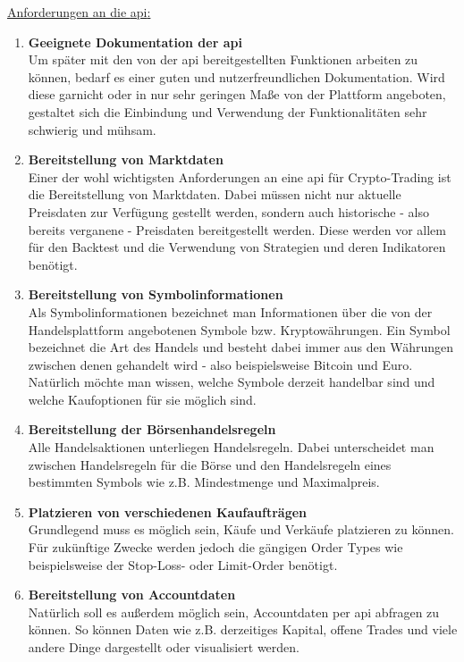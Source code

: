 \documentclass[oneside]{ausarbeitung}
\begin{document}
\underline{Anforderungen an die \ac{api}:}
\begin{enumerate}
	\item \textbf{Geeignete Dokumentation der \ac{api}} \\
		Um später mit den von der \ac{api} bereitgestellten Funktionen arbeiten
		zu können, bedarf es einer guten und nutzerfreundlichen Dokumentation.
		Wird diese garnicht oder in nur sehr geringen Maße von der Plattform
		angeboten, gestaltet sich die Einbindung und Verwendung der 
		Funktionalitäten sehr schwierig und mühsam.
	\item \textbf{Bereitstellung von Marktdaten} \\
		Einer der wohl wichtigsten Anforderungen an eine \ac{api} für
		Crypto-Trading ist die Bereitstellung von Marktdaten. Dabei müssen nicht
		nur aktuelle Preisdaten zur Verfügung gestellt werden, sondern auch
		historische - also bereits verganene - Preisdaten bereitgestellt werden.
		Diese werden vor allem für den Backtest und die Verwendung von
		Strategien und deren Indikatoren benötigt. 
	\item \textbf{Bereitstellung von Symbolinformationen} \\
		Als Symbolinformationen bezeichnet man Informationen über die von der
		Handelsplattform angebotenen Symbole bzw. Kryptowährungen. Ein Symbol
		bezeichnet die Art des Handels und besteht dabei immer aus den Währungen
		zwischen denen gehandelt wird - also beispielsweise Bitcoin und Euro.
		Natürlich möchte man wissen, welche Symbole derzeit handelbar sind und
		welche Kaufoptionen für sie möglich sind.
	\item \textbf{Bereitstellung der Börsenhandelsregeln} \\
		Alle Handelsaktionen unterliegen Handelsregeln. Dabei unterscheidet man
		zwischen Handelsregeln für die Börse und den Handelsregeln eines
		bestimmten Symbols wie z.B. Mindestmenge und Maximalpreis.
	\item \textbf{Platzieren von verschiedenen Kaufaufträgen} \\
		Grundlegend muss es möglich sein, Käufe und Verkäufe platzieren zu
		können. Für zukünftige Zwecke werden jedoch die gängigen Order Types
		wie beispielsweise der Stop-Loss- oder Limit-Order benötigt. 
	\item \textbf{Bereitstellung von Accountdaten} \\
		Natürlich soll es außerdem möglich sein, Accountdaten per \ac{api}
		abfragen zu können. So können Daten wie z.B. derzeitiges Kapital, 
		offene Trades und viele andere Dinge dargestellt oder visualisiert
		werden.
\end{enumerate}
\end{document}
